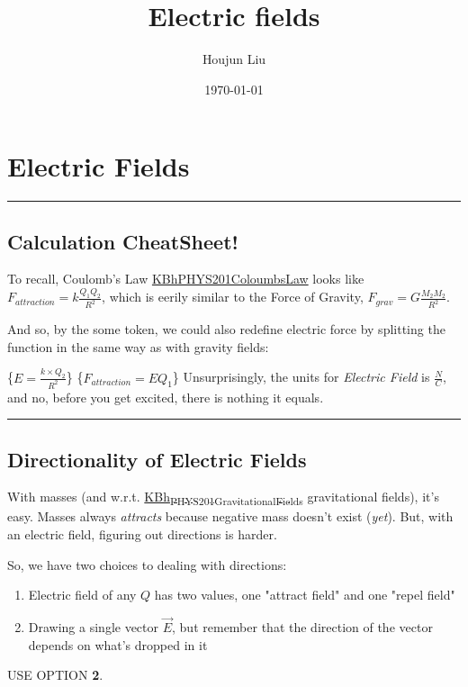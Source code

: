 \documentclass[letterpaper]{article}
\author{Houjun Liu}
\date{\today}
\title{Electric fields}
\renewcommand{\tableofcontents}{}
\begin{document}
\tableofcontents



\section{Electric Fields}
\label{sec:org75da961}
\noindent\rule{\textwidth}{0.5pt}

\subsection{\textbf{Calculation CheatSheet!}}
\label{sec:orgfdc7dcb}
To recall, Coulomb's Law
\href{KBhPHYS201ColoumbsLaw.org}{KBhPHYS201ColoumbsLaw} looks like
\(F_{attraction} = k\frac{Q_1Q_2}{R^2}\), which is eerily similar to the
Force of Gravity, \(F_{grav} = G\frac{M_2M_2}{R^2}\).

And so, by the some token, we could also redefine electric force by
splitting the function in the same way as with gravity fields:

\{\(E = \frac{k \times Q_2}{R^2}\)\}
\{\(F_{attraction} = E Q_1\)\}
Unsurprisingly, the units for \emph{Electric Field} is \(\frac{N}{C}\), and
no, before you get excited, there is nothing it equals.

\noindent\rule{\textwidth}{0.5pt}

\subsection{Directionality of Electric Fields}
\label{sec:org494b7b1}
With masses (and w.r.t.
\href{KBh\_PHYS201\_GravitationalFields.org}{KBh\textsubscript{PHYS201}\textsubscript{GravitationalFields}}
gravitational fields), it's easy. Masses always \emph{attracts} because
negative mass doesn't exist (\emph{yet}). But, with an electric field,
figuring out directions is harder.

So, we have two choices to dealing with directions:

\begin{enumerate}
\item Electric field of any \(Q\) has two values, one "attract field" and
one "repel field"
\item Drawing a single vector \(\vec{E}\), but remember that the direction
of the vector depends on what's dropped in it
\end{enumerate}

USE OPTION \textbf{2}.
\end{document}
